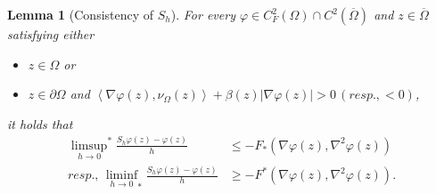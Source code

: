 \documentclass[11pt]{article}
\numberwithin{equation}{section}
\newtheorem{lemma}[theorem]{Lemma}
\newcommand{\relaxlimitSup}[0]{{\limsup_{h\to 0}}^*}
\newcommand{\relaxlimitInf}[0]{{\liminf_{h\to 0}}_*}
\def\le{\leqslant}
\def\ge{\geqslant}
\begin{document}
\begin{lemma}[Consistency of $S_h$]
    \label{lem:Sh_consistency-main}
    For every $\varphi\in C^2_F(\Omega)\cap C^2(\overline{\Omega})$ and $z\in\overline{\Omega}$ satisfying either
    \begin{itemize}
        \item $z\in\Omega$ or
        \item $z\in\partial\Omega$ and $\left<\nabla\varphi(z),\nu_\Omega(z)\right> + \beta(z)|\nabla\varphi(z)| > 0\, (resp., < 0)$,
    \end{itemize}
    it holds that
    \begin{equation}
        \label{eq:consistency-main}
        \begin{aligned}
        \relaxlimitSup\frac{S_h\varphi(z) - \varphi(z)}{h}  &\le - F_*(\nabla\varphi(z), \nabla^2\varphi(z))\\
        resp.,\, \relaxlimitInf\frac{S_h\varphi(z) - \varphi(z)}{h}  &\ge - F^*(\nabla\varphi(z), \nabla^2\varphi(z)).
        \end{aligned}
    \end{equation}
\end{lemma}
\end{document}
